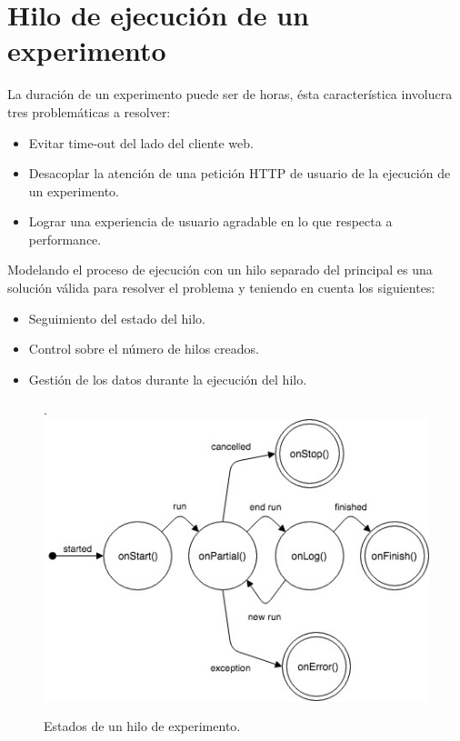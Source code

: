 \section{Hilo de ejecuci\'on de un experimento}

La duraci\'on de un experimento puede ser de horas, \'esta caracter\'istica involucra tres problem\'aticas
a resolver:

\begin{itemize}
    \item Evitar time-out del lado del cliente web.
    \item Desacoplar la atenci\'on de una petici\'on HTTP de usuario de la ejecuci\'on de un experimento.
    \item Lograr una experiencia de usuario agradable en lo que respecta a performance.
\end{itemize}

Modelando el proceso de ejecuci\'on con un hilo separado del principal es una soluci\'on
v\'alida para resolver el problema y teniendo en cuenta los siguientes:

\begin{itemize}
    \item Seguimiento del estado del hilo.
    \item Control sobre el n\'umero de hilos creados.
    \item Gesti\'on de los datos durante la ejecuci\'on del hilo.
\end{itemize}

\begin{figure}[!htb].
    \includegraphics[width=\linewidth]{../figures/d14.jpg}
    \caption{Estados de un hilo de experimento.}
    \label{fig:d14}
\end{figure}

\newpage